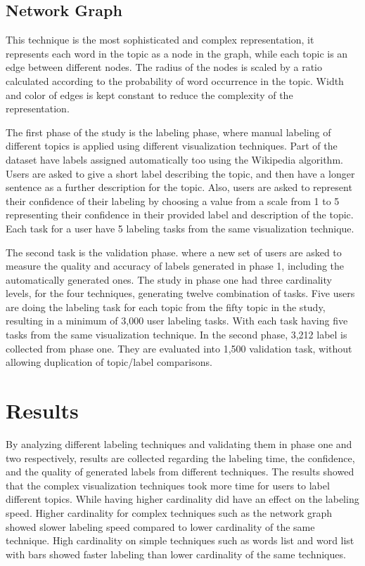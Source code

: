 \subsection{Network Graph}
This technique is the most sophisticated and complex representation, it represents each word in the topic as a node in the graph, while each topic is an
edge between different nodes. The radius of the nodes is scaled by a ratio calculated according to the probability of word occurrence in the topic. Width and
color of edges is kept constant to reduce the complexity of the representation.


\newParagraph
The first phase of the study is the labeling phase, where manual labeling of different topics is applied using different visualization techniques. Part of the
dataset have labels assigned automatically too using the Wikipedia algorithm. Users are asked to give a short label describing the topic, and then have a longer
sentence as a further description for the topic. Also, users are asked to represent their confidence of their labeling by choosing a value from a scale from 1 to 5
representing their confidence in their provided label and description of the topic. Each task for a user have 5 labeling tasks from the same visualization technique.

\newParagraph
The second task is the validation phase. where a new set of users are asked to measure the quality and accuracy of labels generated in phase 1, including the
automatically generated ones. The study in phase one had three cardinality levels, for the four techniques, generating twelve combination of tasks. Five users
are doing the labeling task for each topic from the fifty topic in the study, resulting in a minimum of 3,000 user labeling tasks. With each task having five
tasks from the same visualization technique. In the second phase, 3,212 label is collected from phase one. They are evaluated into 1,500 validation task, without
allowing duplication of topic/label comparisons.

\section{Results}
\label{sec:results}

By analyzing different labeling techniques and validating them in phase one and two respectively, results are collected regarding the labeling time, the confidence,
and the quality of generated labels from different techniques. The results showed that the complex visualization techniques took more time for users to label
different topics. While having higher cardinality did have an effect on the labeling speed. Higher cardinality for complex techniques such as the
network graph showed slower labeling speed compared to lower cardinality of the same technique. High cardinality on simple techniques such as words list and
word list with bars showed faster labeling than lower cardinality of the same techniques.

